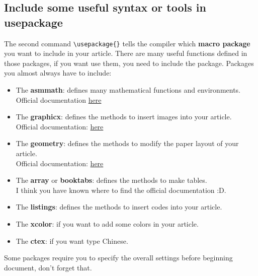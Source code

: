 \documentclass[]{article}
\begin{document}
\subsection{Include some useful syntax or tools in usepackage}
The second command \verb|\usepackage{}| tells the compiler which \textbf{macro package} you want to include in your article. There are many useful functions defined in those packages, if you want use them, you need to include the package. Packages you almost always have to include: 

\begin{itemize}
    \item     The \textbf{asmmath}: defines many mathematical functions and environments.\\
    Official documentation \href{https://www.ctan.org/pkg/amsmath}{here}
\end{itemize}
\begin{itemize}
    \item The \textbf{graphicx}: defines the methods to insert images into your article.\\
    Official documentation:
    \href{https://www.ctan.org/pkg/graphicx}{here}
\end{itemize}
\begin{itemize}
    \item The \textbf{geometry}: defines the methods to modify the paper layout of your article.\\
    Official documentation:
    \href{https://www.ctan.org/pkg/geometry}{here}
\end{itemize}
\begin{itemize}
    \item The \textbf{array} or \textbf{booktabs}: defines the methods to make tables.\\
    I think you have known where to find the official documentation :D.
\end{itemize}
\begin{itemize}
    \item The \textbf{listings}: defines the methods to insert codes into your article.
\end{itemize}
\begin{itemize}
    \item The \textbf{xcolor}: if you want to add some colors in your article.
\end{itemize}
\begin{itemize}
    \item The \textbf{ctex}: if you want type Chinese.
\end{itemize}
Some packages require you to specify the overall settings before beginning document, don't forget that.
\end{document}
